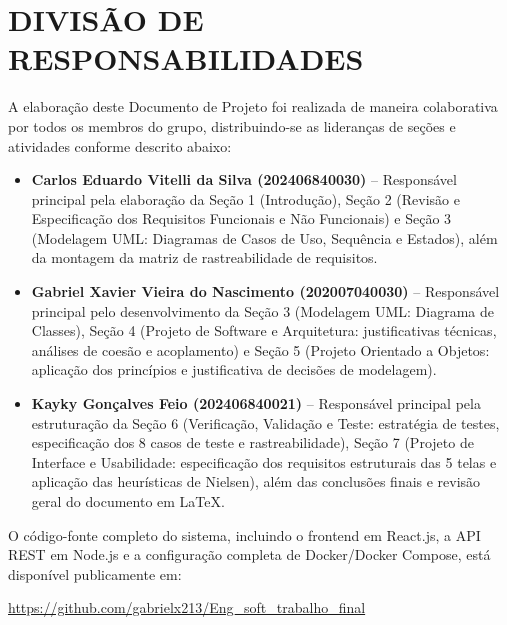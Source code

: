 \section{DIVISÃO DE RESPONSABILIDADES}

A elaboração deste Documento de Projeto foi realizada de maneira colaborativa por todos os membros do grupo, distribuindo-se as lideranças de seções e atividades conforme descrito abaixo:

\begin{itemize}
    \item \textbf{Carlos Eduardo Vitelli da Silva (202406840030)} -- Responsável principal pela elaboração da Seção 1 (Introdução), Seção 2 (Revisão e Especificação dos Requisitos Funcionais e Não Funcionais) e Seção 3 (Modelagem UML: Diagramas de Casos de Uso, Sequência e Estados), além da montagem da matriz de rastreabilidade de requisitos.

    \item \textbf{Gabriel Xavier Vieira do Nascimento (202007040030)} -- Responsável principal pelo desenvolvimento da Seção 3 (Modelagem UML: Diagrama de Classes), Seção 4 (Projeto de Software e Arquitetura: justificativas técnicas, análises de coesão e acoplamento) e Seção 5 (Projeto Orientado a Objetos: aplicação dos princípios e justificativa de decisões de modelagem).

    \item \textbf{Kayky Gonçalves Feio (202406840021)} -- Responsável principal pela estruturação da Seção 6 (Verificação, Validação e Teste: estratégia de testes, especificação dos 8 casos de teste e rastreabilidade), Seção 7 (Projeto de Interface e Usabilidade: especificação dos requisitos estruturais das 5 telas e aplicação das heurísticas de Nielsen), além das conclusões finais e revisão geral do documento em \LaTeX.
\end{itemize}

\vspace{1em}
\noindent O código-fonte completo do sistema, incluindo o frontend em React.js, a API REST em Node.js e a configuração completa de Docker/Docker Compose, está disponível publicamente em:

\begin{center}
    \url{https://github.com/gabrielx213/Eng_soft_trabalho_final}
\end{center}
